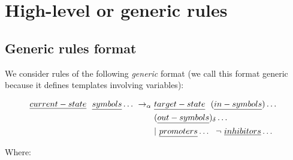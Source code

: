 \section{High-level or generic rules}

\subsection{\label{sec:cps:genericrules}Generic rules format}
We consider rules of the following \emph{generic} format 
(we call this format generic because it defines templates involving variables):
\begin{framed}
\vspace{-0.6cm}
\begin{align*}
\emph{current-state} ~~ \emph{symbols} \dots ~ \rightarrow_\alpha ~ & \emph{target-state} ~~ (\emph{in-symbols}) \dots ~~ \\
 & (\emph{out-symbols})_\delta \dots \\
 & | ~  \emph{promoters} \dots ~~ \neg ~  \emph{inhibitors} \dots
\end{align*}
\vspace{-0.8cm}
\end{framed}
Where:
